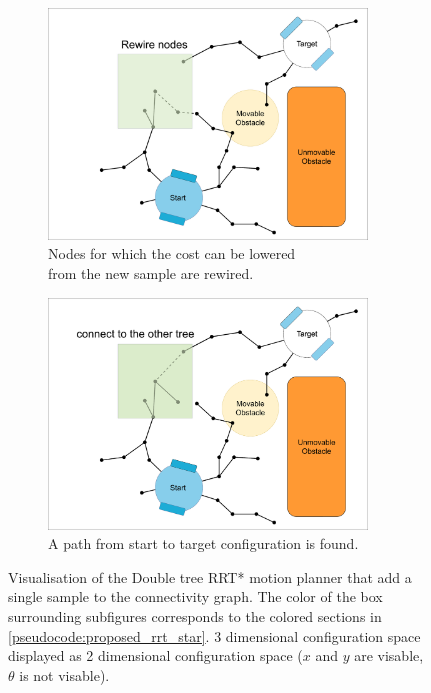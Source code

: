 \begin{figure}[H]
    \begin{subfigure}{.49\textwidth}
    \centering
    \includegraphics[width=0.93\textwidth, cfbox=my_green 5pt 0pt]{figures/mp/5mp_rewire.drawio.png}
    \caption{Nodes for which the cost can be lowered\\from the new sample are rewired.}
    \end{subfigure}
    \begin{subfigure}{.49\textwidth}
    \centering
    \includegraphics[width=0.93\textwidth, cfbox=my_green 5pt 0pt]{figures/mp/6mp_search_other_tree.drawio.png}
    \caption{A path from start to target configuration is found. \bs}
    \end{subfigure}

    \caption{Visualisation of the Double tree \acs{RRT*} motion planner that add a single sample to the connectivity graph. The color of the box surrounding subfigures corresponds to the colored sections in \cref{pseudocode:proposed_rrt_star}. 3 dimensional configuration space displayed as 2 dimensional configuration space ($x$ and $y$ are visable, $\theta$ is not visable).}
    \label{fig:motion_planner_adding_one_sample}
\end{figure}


